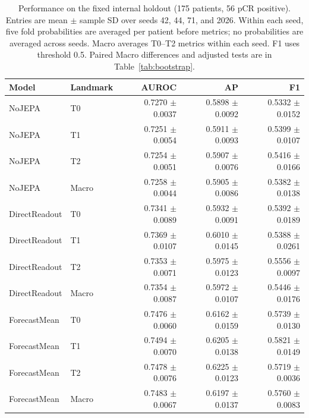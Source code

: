 \begin{table}[t]
\centering
\small
\caption{Performance on the fixed internal holdout (175 patients, 56 pCR positive). Entries are mean $\pm$ sample SD over seeds 42, 44, 71, and 2026. Within each seed, five fold probabilities are averaged per patient before metrics; no probabilities are averaged across seeds. Macro averages T0--T2 metrics within each seed. F1 uses threshold 0.5. Paired Macro differences and adjusted tests are in Table~\ref{tab:bootstrap}.}
\label{tab:main}
\begin{tabular}{llrrr}
\toprule
Model & Landmark & AUROC & AP & F1 \\
\midrule
NoJEPA & T0 & 0.7270 $\pm$ 0.0037 & 0.5898 $\pm$ 0.0092 & 0.5332 $\pm$ 0.0152 \\
NoJEPA & T1 & 0.7251 $\pm$ 0.0054 & 0.5911 $\pm$ 0.0093 & 0.5399 $\pm$ 0.0107 \\
NoJEPA & T2 & 0.7254 $\pm$ 0.0051 & 0.5907 $\pm$ 0.0076 & 0.5416 $\pm$ 0.0166 \\
NoJEPA & Macro & 0.7258 $\pm$ 0.0044 & 0.5905 $\pm$ 0.0086 & 0.5382 $\pm$ 0.0138 \\
DirectReadout & T0 & 0.7341 $\pm$ 0.0089 & 0.5932 $\pm$ 0.0091 & 0.5392 $\pm$ 0.0189 \\
DirectReadout & T1 & 0.7369 $\pm$ 0.0107 & 0.6010 $\pm$ 0.0145 & 0.5388 $\pm$ 0.0261 \\
DirectReadout & T2 & 0.7353 $\pm$ 0.0071 & 0.5975 $\pm$ 0.0123 & 0.5556 $\pm$ 0.0097 \\
DirectReadout & Macro & 0.7354 $\pm$ 0.0087 & 0.5972 $\pm$ 0.0107 & 0.5446 $\pm$ 0.0176 \\
ForecastMean & T0 & 0.7476 $\pm$ 0.0060 & 0.6162 $\pm$ 0.0159 & 0.5739 $\pm$ 0.0130 \\
ForecastMean & T1 & 0.7494 $\pm$ 0.0070 & 0.6205 $\pm$ 0.0138 & 0.5821 $\pm$ 0.0149 \\
ForecastMean & T2 & 0.7478 $\pm$ 0.0076 & 0.6225 $\pm$ 0.0123 & 0.5719 $\pm$ 0.0036 \\
ForecastMean & Macro & 0.7483 $\pm$ 0.0067 & 0.6197 $\pm$ 0.0137 & 0.5760 $\pm$ 0.0083 \\
\bottomrule
\end{tabular}
\end{table}
